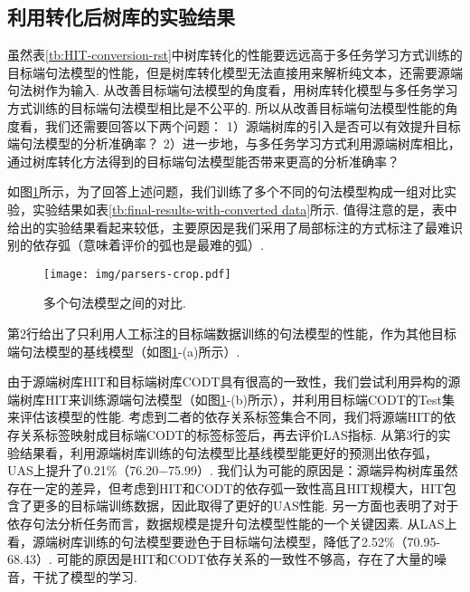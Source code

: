 \subsection{利用转化后树库的实验结果}
虽然表\ref{tb:HIT-conversion-rst}中树库转化的性能要远远高于多任务学习方式训练的目标端句法模型的性能，但是树库转化模型无法直接用来解析纯文本，还需要源端句法树作为输入.
从改善目标端句法模型的角度看，用树库转化模型与多任务学习方式训练的目标端句法模型相比是不公平的.
所以从改善目标端句法模型性能的角度看，我们还需要回答以下两个问题：
1）源端树库的引入是否可以有效提升目标端句法模型的分析准确率？
2）进一步地，与多任务学习方式利用源端树库相比，通过树库转化方法得到的目标端句法模型能否带来更高的分析准确率？

如图\ref{fig:parsers}所示，为了回答上述问题，我们训练了多个不同的句法模型构成一组对比实验，实验结果如表\ref{tb:final-results-with-converted data}所示. 值得注意的是，表中给出的实验结果看起来较低，主要原因是我们采用了局部标注的方式标注了最难识别的依存弧（意味着评价的弧也是最难的弧）.
\begin{figure}[hb!]
    \centering
    \texttt{[image: img/parsers-crop.pdf]}
    \caption{多个句法模型之间的对比. }
    \label{fig:parsers}
\end{figure}



第2行给出了只利用人工标注的目标端数据训练的句法模型的性能，作为其他目标端句法模型的基线模型（如图\ref{fig:parsers}-(a)所示）.

由于源端树库HIT和目标端树库CODT具有很高的一致性，我们尝试利用异构的源端树库HIT来训练源端句法模型（如图\ref{fig:parsers}-(b)所示），并利用目标端CODT的Test集来评估该模型的性能. 考虑到二者的依存关系标签集合不同，我们将源端HIT的依存关系标签映射成目标端CODT的标签标签后，再去评价LAS指标. 从第3行的实验结果看，利用源端树库训练的句法模型比基线模型能更好的预测出依存弧，UAS上提升了0.21\%（76.20−75.99）. 我们认为可能的原因是：源端异构树库虽然存在一定的差异，但考虑到HIT和CODT的依存弧一致性高且HIT规模大，HIT包含了更多的目标端训练数据，因此取得了更好的UAS性能. 另一方面也表明了对于依存句法分析任务而言，数据规模是提升句法模型性能的一个关键因素. 从LAS上看，源端树库训练的句法模型要逊色于目标端句法模型，降低了2.52\%（70.95-68.43）. 可能的原因是HIT和CODT依存关系的一致性不够高，存在了大量的噪音，干扰了模型的学习.

